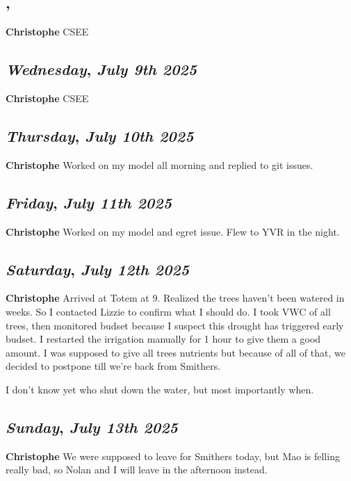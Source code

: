 \subsection*{\weekday, \day}
\textbf {Christophe}
CSEE

\def\day{\textit{July 9th 2025}}
\def\weekday{\textit{Wednesday}}
\subsection*{\weekday, \day}
\textbf {Christophe}
CSEE

\def\day{\textit{July 10th 2025}}
\def\weekday{\textit{Thursday}}
\subsection*{\weekday, \day}
\textbf {Christophe}
Worked on my model all morning and replied to git issues. 

\def\day{\textit{July 11th 2025}}
\def\weekday{\textit{Friday}}
\subsection*{\weekday, \day}
\textbf {Christophe}
Worked on my model and egret issue. Flew to YVR in the night.

\def\day{\textit{July 12th 2025}}
\def\weekday{\textit{Saturday}}
\subsection*{\weekday, \day}
\textbf {Christophe}
Arrived at Totem at 9. Realized the trees haven't been watered in weeks. So I contacted Lizzie to confirm what I should do. I took VWC of all trees, then monitored budset because I suspect this drought has triggered early budset. I restarted the irrigation manually for 1 hour to give them a good amount. I was supposed to give all trees nutrients but because of all of that, we decided to postpone till we're back from Smithers.

I don't know yet who shut down the water, but most importantly when.

\def\day{\textit{July 13th 2025}}
\def\weekday{\textit{Sunday}}
\subsection*{\weekday, \day}
\textbf {Christophe}
We were supposed to leave for Smithers today, but Mao is felling really bad, so Nolan and I will leave in the afternoon instead. 

